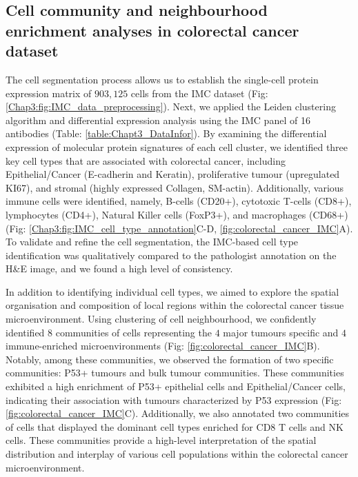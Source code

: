 \subsection{Cell community and neighbourhood enrichment analyses in colorectal cancer dataset}
The cell segmentation process allows us to establish the single-cell protein expression matrix of $903,125$ cells from the IMC dataset (Fig: \ref{Chap3:fig:IMC_data_preprocessing}). Next, we applied the Leiden clustering algorithm and differential expression analysis using the IMC panel of 16 antibodies (Table: \ref{table:Chapt3_DataInfor}). By examining the differential expression of molecular protein signatures of each cell cluster, we identified three key cell types that are associated with colorectal cancer, including Epithelial/Cancer (E-cadherin and Keratin), proliferative tumour (upregulated KI67), and stromal (highly expressed Collagen, SM-actin). Additionally, various immune cells were identified, namely, B-cells (CD20+), cytotoxic T-cells (CD8+), lymphocytes (CD4+), Natural Killer cells (FoxP3+), and macrophages (CD68+) (Fig: \ref{Chap3:fig:IMC_cell_type_annotation}C-D, \ref{fig:colorectal_cancer_IMC}A). To validate and refine the cell segmentation, the IMC-based cell type identification was qualitatively compared to the pathologist annotation on the H\&E image, and we found a high level of consistency.  

In addition to identifying individual cell types, we aimed to explore the spatial organisation and composition of local regions within the colorectal cancer tissue microenvironment. Using clustering of cell neighbourhood, we confidently identified $8$ communities of cells representing the $4$ major tumours specific and $4$ immune-enriched microenvironments (Fig: \ref{fig:colorectal_cancer_IMC}B). Notably, among these communities, we observed the formation of two specific communities: P53+ tumours and bulk tumour communities. These communities exhibited a high enrichment of P53+ epithelial cells and Epithelial/Cancer cells, indicating their association with tumours characterized by P53 expression (Fig: \ref{fig:colorectal_cancer_IMC}C). Additionally, we also annotated two communities of cells that displayed the dominant cell types enriched for CD8 T cells and NK cells. These communities provide a high-level interpretation of the spatial distribution and interplay of various cell populations within the colorectal cancer microenvironment.     

